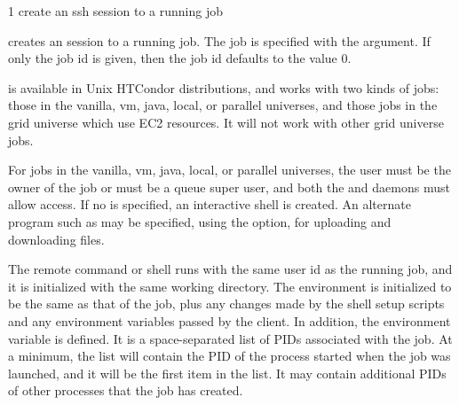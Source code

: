 \begin{ManPage}
{\label{man-condor-ssh-to-job}}{1}
{create an ssh session to a running job}

\Synopsis {}

\ToolDebugOption
{}

\Description

 creates an  session to a running job.
The job is specified with the argument.
If only the job  id is given,
then the job  id defaults to the value 0.

 is available in Unix HTCondor distributions,
and works with two kinds of jobs: those in the vanilla, vm, java, local,
or parallel universes, and those jobs in the grid universe which use EC2
resources.  It will not work with other grid universe jobs.

For jobs in the vanilla, vm, java, local, or parallel universes,
the user must be the owner of the job or must be a queue super user, 
and both the  and  daemons
must allow  access.
If no  is specified, an interactive shell is created.
An alternate  program such as  may be specified,
using the  option, for uploading and downloading files.

The remote command or shell runs with the same user id as the running job,
and it is initialized with the same working directory.
The environment is initialized to be the same as that of the job,
plus any changes made by the shell setup scripts
and any environment variables passed by the  client.
In addition, the environment variable
 is defined.  
It is a space-separated list of PIDs associated with the job.
At a minimum, the list will contain the
PID of the process started when the job was launched,
and it will be the first item in the list.
It may contain additional PIDs of other processes that the job has created.


\end{ManPage}
